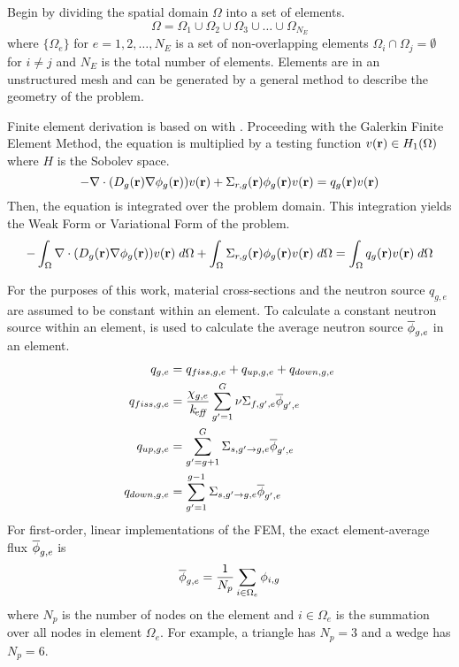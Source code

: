     Begin by dividing the spatial domain $\Omega$ into a set of elements.
    \begin{equation}
      \label{eq:set_of_elements}
      \Omega = \Omega_1 \cup \Omega_2 \cup \Omega_3 \cup \ldots \cup
        \Omega_{N_E} 
    \end{equation}
    where $\{\Omega_e\}$ for $e = 1,2,\ldots,N_E$ is a set of
    non-overlapping elements $\Omega_i \cap \Omega_j = \emptyset$ for $i \ne j$ 
    and $N_E$ is the total number of elements. Elements are in an unstructured
    mesh and can be generated by a general method to describe the geometry of 
    the problem.
    
    Finite element derivation is based on with .
    Proceeding with the Galerkin Finite Element Method, the equation is 
    multiplied by a testing function $v(\mathbf{r}) \in H_1(\Omega)$ 
    where $H$ is the Sobolev space. 
    \begin{equation}
      -\mathbf{\nabla} \cdot (D_g(\mathbf{r}) \mathbf{\nabla} \phi_g(\mathbf{r})) v(\mathbf{r}) + 
        \Sigma_{r,g}(\mathbf{r}) \phi_g(\mathbf{r}) v(\mathbf{r}) =
        q_g(\mathbf{r}) v(\mathbf{r})
    \end{equation}
    Then, the equation is integrated over the problem domain. This integration
    yields the Weak Form or Variational Form of the problem.
    \begin{equation}
      \label{eq:fem_weak_form}
      - \int_{\Omega} \mathbf{\nabla} \cdot (D_g(\mathbf{r}) \mathbf{\nabla} \phi_g(\mathbf{r})) v(\mathbf{r}) \; d\Omega
        + \int_{\Omega} \Sigma_{r,g}(\mathbf{r}) \phi_g(\mathbf{r}) v(\mathbf{r}) \;d\Omega =
        \int_{\Omega} q_g(\mathbf{r}) v(\mathbf{r}) \;d\Omega
    \end{equation}
    
    For the purposes of this work, material cross-sections and the
    neutron source $q_{g,e}$ are assumed to be constant within an element. 
    To calculate a constant neutron source within an element,  is
    used to calculate the average neutron source $\overline{\phi}_{g,e}$ in an element.
    \begin{align}
      q_{g,e} &= q_{fiss,g,e} + q_{up,g,e} + q_{down,g,e} \\
      \label{eq:qelement_fiss}
      q_{fiss,g,e} &= \frac{\chi_{g,e}}{k_{\!\mbox{\scriptsize \em eff}}} \sum_{g'=1}^G \nu
        \Sigma_{f,g',e} \overline{\phi}_{g',e} \\
      \label{eq:qelement_up}
      q_{up,g,e} &= \sum_{g'=g+1}^G \Sigma_{s,g' \rightarrow g,e}
        \overline{\phi}_{g',e}\\
      \label{eq:qelement_down}
      q_{down,g,e} &= \sum_{g'=1}^{g-1} \Sigma_{s,g' \rightarrow g,e}
        \overline{\phi}_{g',e}
    \end{align}
    For first-order, linear implementations of the FEM, the exact
    element-average flux $\overline{\phi}_{g,e}$ is
    \begin{equation}
      \label{eq:phiavg}
      \overline{\phi}_{g,e} = \frac{1}{N_p} \sum_{i \in \Omega_e} \phi_{i,g}
    \end{equation}
    where $N_p$ is the number of nodes on the element and $i \in
    \Omega_e$ is the summation over all nodes in element $\Omega_e$. For 
    example, a triangle has $N_p = 3$ and a wedge has $N_p = 6$.

